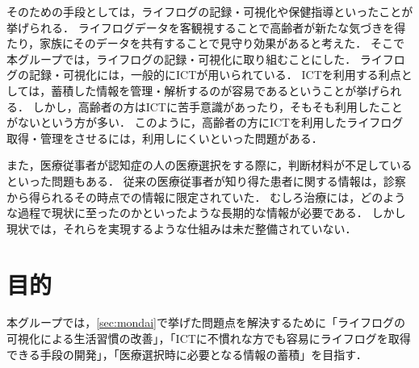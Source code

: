 \documentclass[../report]{subfiles}
\begin{document}
そのための手段としては，ライフログの記録・可視化や保健指導といったことが挙げられる\cite{lifelog}．
ライフログデータを客観視することで高齢者が新たな気づきを得たり，家族にそのデータを共有することで見守り効果があると考えた．
そこで本グループでは，ライフログの記録・可視化に取り組むことにした．
ライフログの記録・可視化には，一般的にICTが用いられている．
ICTを利用する利点としては，蓄積した情報を管理・解析するのが容易であるということが挙げられる．
しかし，高齢者の方はICTに苦手意識があったり，そもそも利用したことがないという方が多い．
このように，高齢者の方にICTを利用したライフログ取得・管理をさせるには，利用しにくいといった問題がある．

また，医療従事者が認知症の人の医療選択をする際に，判断材料が不足しているといった問題もある．
従来の医療従事者が知り得た患者に関する情報は，診察から得られるその時点での情報に限定されていた．
むしろ治療には，どのような過程で現状に至ったのかといったような長期的な情報が必要である．
しかし現状では，それらを実現するような仕組みは未だ整備されていない．

\section{目的}
本グループでは，\ref{sec:mondai}で挙げた問題点を解決するために「ライフログの可視化による生活習慣の改善」，「ICTに不慣れな方でも容易にライフログを取得できる手段の開発」，「医療選択時に必要となる情報の蓄積」を目指す．
\end{document}
